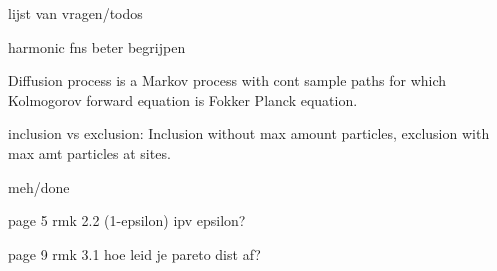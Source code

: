 lijst van vragen/todos

harmonic fns beter begrijpen

Diffusion process is a Markov process with cont sample paths for which Kolmogorov forward equation is Fokker Planck equation.

inclusion vs exclusion: Inclusion without max amount particles, exclusion with max amt particles at sites.









meh/done

page 5 rmk 2.2 (1-epsilon) ipv epsilon?

page 9 rmk 3.1 hoe leid je pareto dist af?











